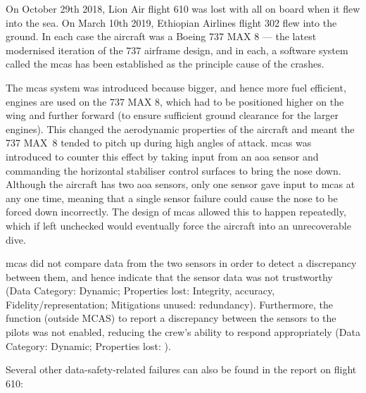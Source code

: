 On October 29th 2018, Lion Air flight 610 was lost with all on board when it flew into the sea. On March 10th 2019, Ethiopian Airlines flight 302 flew into the ground. In each case the aircraft was a Boeing 737 MAX 8 --- the latest modernised iteration of the 737 airframe design, and in each, a software system called the \gls{mcas} has been established as the principle cause of the crashes.

The \gls{mcas} system was introduced because bigger, and hence more fuel efficient, engines are used on the 737 MAX 8, which had to be positioned higher on the wing and further forward (to ensure sufficient ground clearance for the larger engines). This changed the aerodynamic properties of the aircraft and meant the 737 MAX~8 tended to pitch up during high angles of attack. \Gls{mcas} was introduced to counter this effect by taking input from an \gls{aoa} sensor and commanding the horizontal stabiliser control surfaces to bring the nose down. Although the aircraft has two \gls{aoa} sensors, only one sensor gave input to \gls{mcas} at any one time, meaning that a single sensor failure could cause the nose to be forced down incorrectly. The design of \gls{mcas} allowed this to happen repeatedly, which if left unchecked would eventually force the aircraft into an unrecoverable dive.

\Gls{mcas} did not compare data from the two sensors in order to detect a discrepancy between them, and hence indicate that the sensor data was not trustworthy (Data Category: Dynamic; Properties lost: Integrity, \gls{accuracy}, Fidelity/representation; Mitigations unused: redundancy). Furthermore, the function (outside MCAS) to report a discrepancy between the sensors to the pilots was not enabled, reducing the crew's ability to respond appropriately (Data Category: Dynamic; Properties lost: ).

Several other data-safety-related failures can also be found in the report on flight 610:

